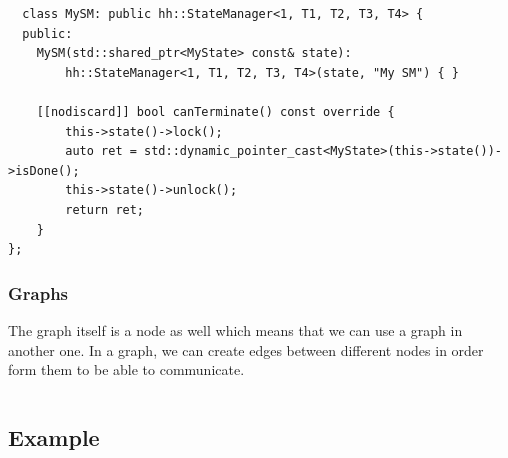 \begin{verbatim}
  class MySM: public hh::StateManager<1, T1, T2, T3, T4> {
  public:
    MySM(std::shared_ptr<MyState> const& state):
        hh::StateManager<1, T1, T2, T3, T4>(state, "My SM") { }

    [[nodiscard]] bool canTerminate() const override {
        this->state()->lock();
        auto ret = std::dynamic_pointer_cast<MyState>(this->state())->isDone();
        this->state()->unlock();
        return ret;
    }
};
\end{verbatim}
\label{lst:statemanager}

\subsubsection{Graphs}

The graph itself is a node as well which means that we can use a graph in
another one. In a graph, we can create edges between different nodes in order
form them to be able to communicate.

\begin{verbatim}

\end{verbatim}
\label{lst:graph}

\subsection{Example}
